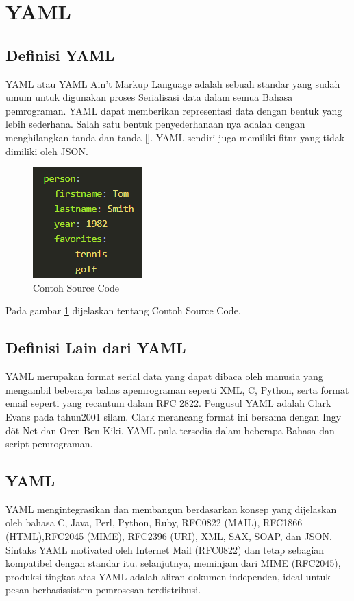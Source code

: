 \documentclass[a4paper]{article}
\begin{document}
\section{YAML}
\subsection{Definisi YAML}
YAML atau YAML Ain't Markup Language adalah sebuah standar yang sudah umum untuk digunakan proses Serialisasi data dalam semua Bahasa pemrograman. YAML dapat memberikan representasi data dengan bentuk yang lebih sederhana. Salah satu bentuk penyederhanaan nya adalah dengan menghilangkan tanda {} dan tanda []. YAML sendiri juga memiliki fitur yang tidak dimiliki oleh JSON.
\begin{figure}[ht]
\centerline{\includegraphics[scale=1]{../figures/5SC.png} }

\caption{Contoh Source Code} 
\label{Sc}
\end{figure}

Pada gambar \ref{Sc} dijelaskan tentang Contoh Source Code.

\subsection{Definisi Lain dari YAML}
YAML merupakan format serial data yang dapat dibaca oleh manusia yang mengambil beberapa bahas apemrograman seperti XML, C, Python, serta format email seperti yang recantum dalam RFC 2822. Pengusul YAML adalah Clark Evans pada tahun2001 silam. Clark merancang format ini bersama dengan Ingy döt Net dan Oren Ben-Kiki. YAML pula tersedia dalam beberapa Bahasa dan script pemrograman.
\subsection{YAML}
YAML mengintegrasikan dan membangun berdasarkan konsep yang dijelaskan oleh bahasa C, Java, Perl, Python, Ruby, RFC0822 (MAIL), RFC1866 (HTML),RFC2045 (MIME), RFC2396 (URI), XML, SAX, SOAP, dan JSON.
Sintaks YAML motivated oleh Internet Mail (RFC0822) dan tetap sebagian kompatibel dengan standar itu. selanjutnya, meminjam dari MIME (RFC2045), produksi tingkat atas YAML adalah aliran dokumen independen, ideal untuk pesan berbasissistem pemrosesan terdistribusi.
\end{document}
